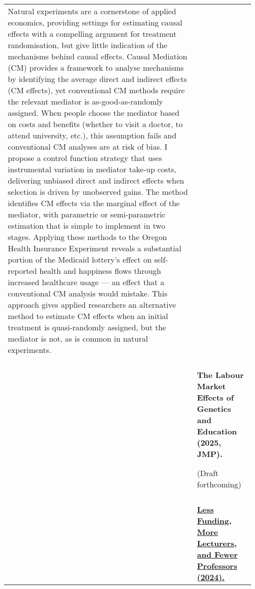 \documentclass[letterpaper,11pt,oneside]{article}
\begin{document}
\begin{longtable}[\textwidth]{p{} p{}}
    Natural experiments are a cornerstone of applied economics, providing settings for estimating causal effects with a compelling argument for treatment randomisation, but give little indication of the mechanisms behind causal effects.
    Causal Mediation (CM) provides a framework to analyse mechanisms by identifying the average direct and indirect effects (CM effects), yet conventional CM methods require the relevant mediator is as-good-as-randomly assigned.
    When people choose the mediator based on costs and benefits (whether to visit a doctor, to attend university, etc.), this assumption fails and conventional CM analyses are at risk of bias.
    I propose a control function strategy that uses instrumental variation in mediator take-up costs, delivering unbiased direct and indirect effects when selection is driven by unobserved gains.
    The method identifies CM effects via the marginal effect of the mediator, with parametric or semi-parametric estimation that is simple to implement in two stages.
    Applying these methods to the Oregon Health Insurance Experiment reveals a substantial portion of the Medicaid lottery's effect on self-reported health and happiness flows through increased healthcare usage --- an effect that a conventional CM analysis would mistake.
    This approach gives applied researchers an alternative method to estimate CM effects when an initial treatment is quasi-randomly assigned, but the mediator is not, as is common in natural experiments. \\ \\

    & \textbf{The Labour Market Effects of Genetics and Education (2025, JMP).}

    (Draft forthcoming)  \\ \\

    & \textbf{\href{https://raw.githubusercontent.com/shoganhennessy/state-funding-faculty/main/state-funding-faculty-2024.pdf}{
        Less Funding, More Lecturers, and Fewer Professors (2024).}}


\end{longtable}
\end{document}
